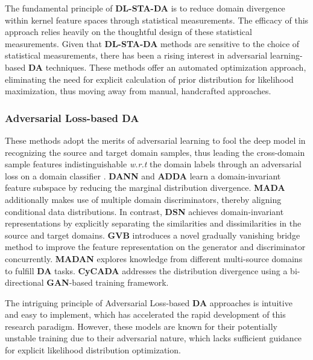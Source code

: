 The fundamental principle of \textbf{DL-STA-DA} is to reduce domain divergence within kernel feature spaces \cite{belkin2018understand} through statistical measurements. The efficacy of this approach relies heavily on the thoughtful design of these statistical measurements. Given that \textbf{DL-STA-DA} methods are sensitive to the choice of statistical measurements, there has been a rising interest in adversarial learning-based \textbf{DA} techniques. These methods offer an automated optimization approach, eliminating the need for explicit calculation of prior distribution for likelihood maximization, thus moving away from manual, handcrafted approaches.






\subsubsection{Adversarial Loss-based DA}
\label{Adversarial loss-based DA}
These methods adopt the merits of adversarial learning \cite{goodfellow2014generative} to fool the deep model in recognizing the source and target domain samples, thus leading the cross-domain sample features indistinguishable \textit{w.r.t} the domain labels through an adversarial loss on a domain classifier \cite{ganin2016domain,tzeng2017adversarial,pei2018multi}. \textbf{DANN} \cite{ganin2016domain} and \textbf{ADDA} \cite{tzeng2017adversarial} learn a domain-invariant feature subspace by reducing the marginal distribution divergence. \textbf{MADA} \cite{pei2018multi} additionally makes use of multiple domain discriminators, thereby aligning conditional data distributions.  In contrast, \textbf{DSN} \cite{bousmalis2016domain} achieves domain-invariant representations by explicitly separating the similarities and dissimilarities in the source and target domains. \textbf{GVB} \cite{cui2020gradually} introduces a novel gradually vanishing bridge method to improve the feature representation on the generator and discriminator concurrently. \textbf{MADAN} \cite{zhao2019multi} explores knowledge from different multi-source domains to fulfill \textbf{DA} tasks. \textbf{CyCADA} \cite{pmlr-v80-hoffman18a} addresses the distribution divergence using a bi-directional \textbf{GAN}-based training framework. 


The intriguing principle of Adversarial Loss-based \textbf{DA} approaches is intuitive and easy to implement, which has accelerated the rapid development of this research paradigm. However, these models are known for their potentially unstable training due to their adversarial nature, which lacks sufficient guidance \cite{bond2021deep, yang2022survey} for explicit likelihood distribution optimization.


